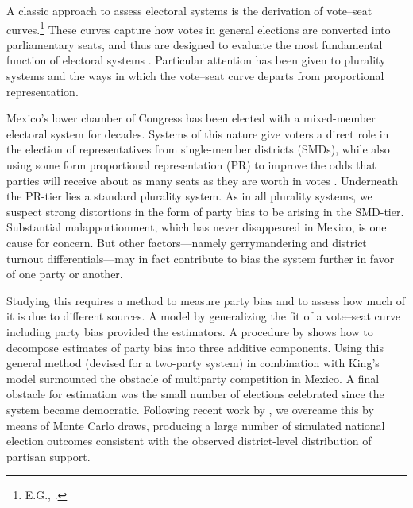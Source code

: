 \documentclass[letter,12pt]{article}
\begin{document}


\noindent A classic approach to assess electoral systems is the derivation of vote--seat curves.\footnote{E.G., \citet{rae.1967,tufte1973seatsVotes,erikson1972malapportionment,dahl.1956prefDemoc,gudgin.taylor.1979seatsVotes,taagepera.shugart.1989,taagepera.CubeLaw.1973,king.1990elRespBiasMultiparty,king.browning1987biasRespUS,gelman.king.1994EvalElSysRedis}.} These curves capture how votes in general elections are converted into parliamentary seats, and thus are designed to evaluate the most fundamental function of electoral systems \citep{lijphartElSysPtySys.1994}. Particular attention has been given to plurality systems and the ways in which the vote--seat curve departs from proportional representation. 

Mexico's lower chamber of Congress has been elected with a mixed-member electoral system for decades. Systems of this nature give voters a direct role in the election of representatives from single-member districts (SMDs), while also using some form proportional representation (PR) to improve the odds that parties will receive about as many seats as they are worth in votes \citep{shugart.wattenbergIntro2001}. Underneath the PR-tier lies a standard plurality system. As in all plurality systems, we suspect strong distortions in the form of party bias to be arising in the SMD-tier. Substantial malapportionment, which has never disappeared in Mexico, is one cause for concern. But other factors---namely gerrymandering and district turnout differentials---may in fact contribute to bias the system further in favor of one party or another.   

Studying this requires a method to measure party bias and to assess how much of it is due to different sources. A model by \citet{king.1990elRespBiasMultiparty} generalizing the fit of a vote--seat curve including party bias provided the estimators. A procedure by \citet{grofman.etalBiasMalapp.1997} shows how to decompose estimates of party bias into three additive components. Using this general method (devised for a two-party system) in combination with King's model surmounted the obstacle of multiparty competition in Mexico. A final obstacle for estimation was the small number of elections celebrated since the system became democratic. Following recent work by \citet{linzerSeatVoteElasticity2012}, we overcame this by means of Monte Carlo draws, producing a large number of simulated national election outcomes consistent with the observed district-level distribution of partisan support. 
\end{document}
